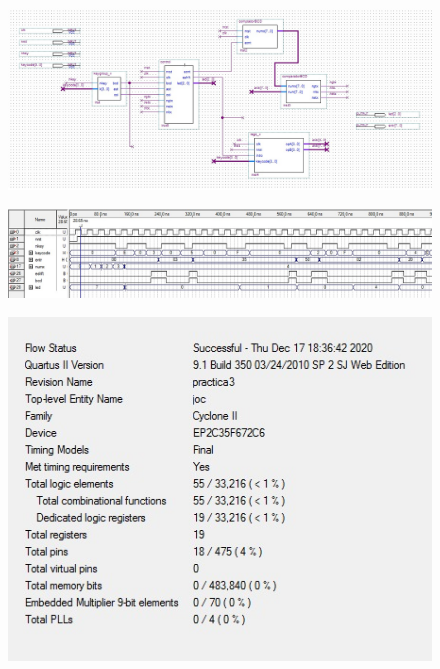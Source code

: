 \documentclass[12pt, a4papre]{article}
\begin{document}
				\begin{figure}[H]
		\begin{center}
		\includegraphics[width=130mm]{joc.jpeg}
		\end{center}
	\end{figure}	
			\begin{figure}[H]
		\begin{center}
		\includegraphics[width=130mm]{simulacioJoc.jpeg}
		\end{center}
	\end{figure}	
			\begin{figure}[H]
		\begin{center}
		\includegraphics[width=130mm]{informeJoc.jpeg}
		\end{center}
	\end{figure}	
\end{document}
